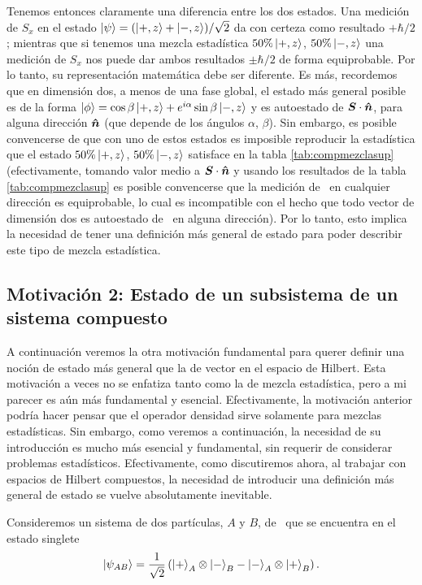 \documentclass[10pt, a4paper]{article}
\numberwithin{equation}{subsection}
\begin{document}
Tenemos entonces claramente una diferencia entre los dos estados. Una medición
de $S_x$ en el estado $\ket{\psi} = (\ket{+,z} + \ket{-,z})/\sqrt{2}$ da con
certeza como resultado $+\hbar/2$; mientras que si tenemos una mezcla
estadística $50\%\ket{+,z}$, $50\%\ket{-,z}$ una medición de $S_x$ nos puede
dar ambos resultados $\pm\hbar/2$ de forma equiprobable. Por lo tanto, su
representación matemática debe ser diferente. Es más, recordemos que en
dimensión dos, a menos de una fase global, el estado más general posible es de
la forma $\ket{\phi} = \cos\beta\ket{+,z} + e^{i\alpha}\sin\beta\ket{-,z}$ y
es autoestado de $\vb*{S}\cdot\vu*{n}$, para alguna dirección $\vu*{n}$
(que depende de los ángulos $\alpha$, $\beta$). Sin embargo, es posible
convencerse de que con uno de estos estados es imposible reproducir la
estadística que el estado $50\%\ket{+,z}$, $50\%\ket{-,z}$ satisface en la
tabla \ref{tab:compmezclasup} (efectivamente, tomando valor medio a
$\vb*{S}\cdot\vu*{n}$ y usando los resultados de la tabla
\ref{tab:compmezclasup} es posible convencerse que la medición de \spin~en
cualquier dirección es equiprobable, lo cual es incompatible con el hecho que
todo vector de dimensión dos es autoestado de \spin~en alguna dirección).
Por lo tanto, esto implica la necesidad de tener una definición más general de
estado para poder describir este tipo de mezcla estadística.

\subsection{Motivación 2: Estado de un subsistema de un sistema compuesto}
A continuación veremos la otra motivación fundamental para querer definir una
noción de estado más general que la de vector en el espacio de Hilbert. Esta
motivación a veces no se enfatiza tanto como la de mezcla estadística, pero a
mi parecer es aún más fundamental y esencial. Efectivamente, la motivación
anterior podría hacer pensar que el operador densidad sirve solamente para
mezclas estadísticas. Sin embargo, como veremos a continuación, la necesidad de
su introducción es mucho más esencial y fundamental, sin requerir de considerar
problemas estadísticos. Efectivamente, como discutiremos ahora, al trabajar
con espacios de Hilbert compuestos, la necesidad de introducir una definición
más general de estado se vuelve absolutamente inevitable.

Consideremos un sistema de dos partículas, $A$ y $B$, de \spinhalf~que se
encuentra en el estado singlete
\begin{equation}
  \ket{\psi_{AB}} = \frac{1}{\sqrt{2}}\left(\ket{+}_A\otimes\ket{-}_B -
  \ket{-}_A\otimes\ket{+}_B\right).
\end{equation}
\end{document}
